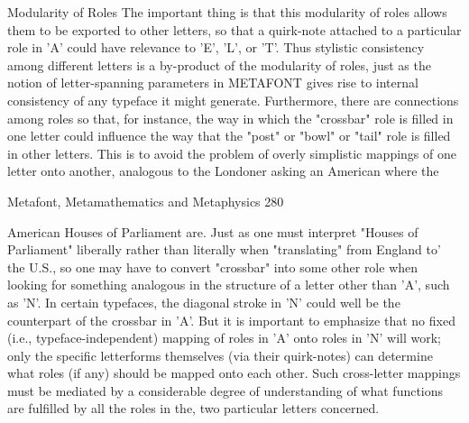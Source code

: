                                   Modularity of Roles
         The important thing is that this modularity of roles allows them to be exported to
other letters, so that a quirk-note attached to a particular role in 'A' could have relevance
to 'E', 'L', or 'T'. Thus stylistic consistency among different letters is a by-product of the
modularity of roles, just as the notion of letter-spanning parameters in METAFONT
gives rise to internal consistency of any typeface it might generate.
         Furthermore, there are connections among roles so that, for instance, the way in
which the "crossbar" role is filled in one letter could influence the way that the "post" or
"bowl" or "tail" role is filled in other letters. This is to avoid the problem of overly
simplistic mappings of one letter onto another, analogous to the Londoner asking an
American where the




Metafont, Metamathematics and Metaphysics                                                  280

American Houses of Parliament are. Just as one must interpret "Houses of Parliament"
liberally rather than literally when "translating" from England to' the U.S., so one may
have to convert "crossbar" into some other role when looking for something analogous in
the structure of a letter other than 'A', such as 'N'. In certain typefaces, the diagonal stroke
in 'N' could well be the counterpart of the crossbar in 'A'. But it is important to emphasize
that no fixed (i.e., typeface-independent) mapping of roles in 'A' onto roles in 'N' will
work; only the specific letterforms themselves (via their quirk-notes) can determine what
roles (if any) should be mapped onto each other. Such cross-letter mappings must be
mediated by a considerable degree of understanding of what functions are fulfilled by all
the roles in the, two particular letters concerned.

